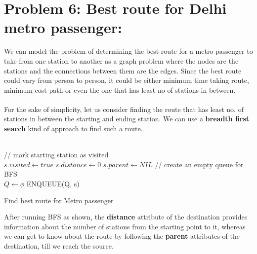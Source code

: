 \documentclass[12pt]{report}
\begin{document}
\section{Problem 6: Best route for Delhi metro passenger:}
We can model the problem of determining the best route for a metro passenger to take from one station to another as a graph problem where the nodes are the stations and the connections between them are the edges. Since the best route could vary from person to person, it could be either minimum time taking route, minimum cost path or even the one that has least no of stations in between.
\\ \\
For the sake of simplicity, let us consider finding the route that has least no. of stations in between the starting and ending station. We can use a \textbf{breadth first search} kind of approach to find such a route. 
\\ \\

\begin{algorithm}[H]
	\SetAlgoLined
	// mark starting station as visited \\
	$s.visited \gets true $ \;
	$s.distance \gets 0 $ \;
	$s.parent \gets NIL $\;
	// create an empty queue for BFS \\
	$Q \gets \phi $ \;
	ENQUEUE(Q, s) \;
	\caption{Find best route for Metro passenger}	
\end{algorithm}

After running BFS as shown, the \textbf{distance} attribute of the destination provides information about the number of stations from the starting point to it, whereas we can get to know about the route by following the \textbf{parent} attributes of the destination, till we reach the source. 
\\
\end{document}
